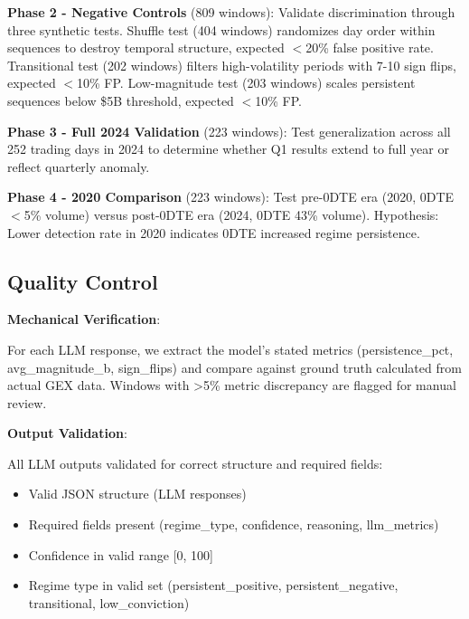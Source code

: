 \vspace{0.2cm}

\noindent\textbf{Phase 2 - Negative Controls} (809 windows): Validate discrimination through three synthetic tests. Shuffle test (404 windows) randomizes day order within sequences to destroy temporal structure, expected $<$20\% false positive rate. Transitional test (202 windows) filters high-volatility periods with 7-10 sign flips, expected $<$10\% FP. Low-magnitude test (203 windows) scales persistent sequences below \$5B threshold, expected $<$10\% FP.

\vspace{0.2cm}

\noindent\textbf{Phase 3 - Full 2024 Validation} (223 windows): Test generalization across all 252 trading days in 2024 to determine whether Q1 results extend to full year or reflect quarterly anomaly.

\vspace{0.2cm}

\noindent\textbf{Phase 4 - 2020 Comparison} (223 windows): Test pre-0DTE era (2020, 0DTE $<$5\% volume) versus post-0DTE era (2024, 0DTE 43\% volume). Hypothesis: Lower detection rate in 2020 indicates 0DTE increased regime persistence.

\subsection{Quality Control}

\vspace{0.2cm}

\noindent\textbf{Mechanical Verification}:

For each LLM response, we extract the model's stated metrics (persistence\_pct, avg\_magnitude\_b, sign\_flips) and compare against ground truth calculated from actual GEX data. Windows with >5\% metric discrepancy are flagged for manual review.

\vspace{0.2cm}

\noindent\textbf{Output Validation}:

All LLM outputs validated for correct structure and required fields:
\begin{itemize}
\item Valid JSON structure (LLM responses)
\item Required fields present (regime\_type, confidence, reasoning, llm\_metrics)
\item Confidence in valid range [0, 100]
\item Regime type in valid set (persistent\_positive, persistent\_negative, transitional, low\_conviction)
\end{itemize}

